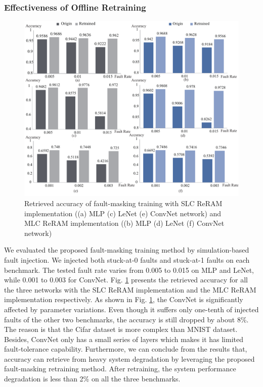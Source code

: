 \subsubsection{Effectiveness of Offline Retraining}
\begin{figure}
    \centering
    \includegraphics[width=0.8\linewidth]{images/OL-fig15}
    \vspace{-20pt}
    \caption{ Retrieved accuracy of fault-masking training with SLC ReRAM implementation ((a) MLP (c) LeNet (e) ConvNet network) and MLC ReRAM implementation ((b) MLP (d) LeNet (f) ConvNet network)}
    \label{fig:retraining}
    \vspace{-20pt}
\end{figure}


We evaluated the proposed fault-masking training method by simulation-based fault injection. We injected both stuck-at-0 faults and stuck-at-1 faults on each benchmark. The tested fault rate varies from 0.005 to 0.015 on MLP and LeNet, while 0.001 to 0.003 for ConvNet. Fig. \ref{fig:retraining} presents the retrieved accuracy for all the three networks with the SLC ReRAM implementation and the MLC ReRAM implementation respectively. As shown in Fig. \ref{fig:retraining}, the ConvNet is significantly affected by parameter variations. Even though it suffers only one-tenth of injected faults of the other two benchmarks, the accuracy is still dropped by about 8\%. The reason is that the Cifar dataset is more complex than MNIST dataset. Besides, ConvNet only has a small series of layers which makes it has limited fault-tolerance capability. Furthermore, we can conclude from the results that, accuracy can retrieve from heavy system degradation by leveraging the proposed fault-masking retraining method. After retraining, the system performance degradation is less than 2\% on all the three benchmarks.


